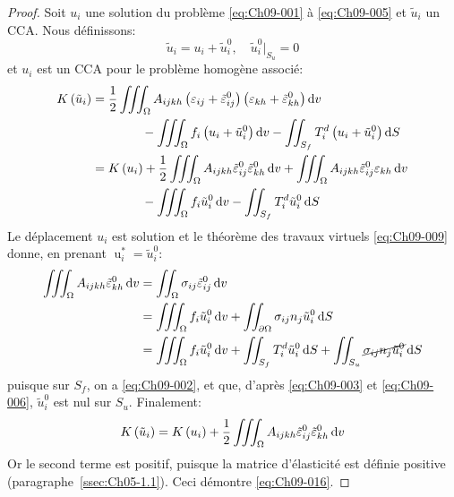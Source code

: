 \begin{proof}
    Soit $u_i$ une solution du problème \eqref{eq:Ch09-001} à \eqref{eq:Ch09-005} et $\tilde{u}_i$ un CCA.
    Nous définissons:
    \begin{equation}
        \tilde{u}_i = u_i + \tilde{u}_i^0,\quad \tilde{u}_i^0|_{S_u} = 0
        \label{eq:Ch09-017}
    \end{equation}
    et $u_i$ est un CCA pour le problème homogène associé: 
    \begin{align*}
        K\left(\tilde{u}_i\right) &=\frac{1}{2} \iiint_{\Omega} A_{ijkh} \left( \varepsilon_{ij} + \tilde{\varepsilon}_{ij}^0 \right) \left( \varepsilon_{kh} + \tilde{\varepsilon}_{kh}^0 \right) \mathop{\mathrm{{}d}}\mathopen{} v\\&\qquad\qquad - \iiint_{\Omega} f_i \left( u_i + \tilde{u}_i^0 \right) \mathop{\mathrm{{}d}}\mathopen{} v - \iint_{S_f} T_i^d \left( u_i + \tilde{u}_i^0 \right) \mathop{\mathrm{{}d}}\mathopen{} S \\
        &= K\left( u_i \right) + \frac{1}{2} \iiint_{\Omega} A_{ijkh} \tilde{\varepsilon}_{ij}^0 \tilde{\varepsilon}_{kh}^0 \mathop{\mathrm{{}d}}\mathopen{} v + \iiint_{\Omega} A_{ijkh} \tilde{\varepsilon}_{ij}^0 \varepsilon_{kh} \mathop{\mathrm{{}d}}\mathopen{} v \\& \qquad\qquad- \iiint_{\Omega} f_i \tilde{u}_i^0 \mathop{\mathrm{{}d}}\mathopen{} v - \iint_{S_f} T_i^d \tilde{u}_i^0 \mathop{\mathrm{{}d}}\mathopen{} S
    \end{align*}
Le déplacement $u_i$ est solution et le théorème des travaux virtuels \eqref{eq:Ch09-009} donne, en prenant ${\mathop{u}_i^{\ast}} = \tilde{u}_i^0$:
    \begin{align*}
        \iiint_{\Omega} A_{ijkh} \tilde{\varepsilon}_{kh}^0 \mathop{\mathrm{{}d}}\mathopen{} v &= \iint_{\Omega} \sigma_{ij} \tilde{\varepsilon}_{ij}^0 \mathop{\mathrm{{}d}}\mathopen{} v \\
        &= \iiint_{\Omega} f_i \tilde{u}_i^0 \mathop{\mathrm{{}d}}\mathopen{} v + \iint_{\partial \Omega} \sigma_{ij} n_j \tilde{u}_i^0 \mathop{\mathrm{{}d}}\mathopen{} S \\
        &= \iiint_{\Omega} f_i \tilde{u}_i^0 \mathop{\mathrm{{}d}}\mathopen{} v + \iint_{S_f} T_i^d \tilde{u}_i^0 \mathop{\mathrm{{}d}}\mathopen{} S + \iint_{S_u} \cancel{\sigma_{ij} n_j \tilde{u}_i^0} \mathop{\mathrm{{}d}}\mathopen{} S
    \end{align*}
    puisque sur $S_f$, on a \eqref{eq:Ch09-002}, et que, d'après \eqref{eq:Ch09-003} et \eqref{eq:Ch09-006}, $\tilde{u}_i^0$ est nul sur $S_u$.
    Finalement:
    \begin{equation}
        K\left( \tilde{u}_i \right) = K \left( u_i \right) + \frac{1}{2} \iiint_{\Omega} A_{ijkh} \tilde{\varepsilon}_{ij}^0 \tilde{\varepsilon}_{kh}^0 \mathop{\mathrm{{}d}}\mathopen{} v
        \label{eq:Ch09-018}
    \end{equation}
    Or le second terme est positif, puisque la matrice d'élasticité est définie positive (paragraphe~\ref{ssec:Ch05-1.1}).
    Ceci démontre \eqref{eq:Ch09-016}.
\end{proof}

